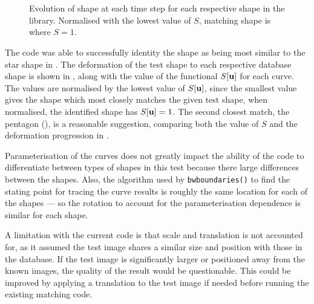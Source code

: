 \documentclass[a4paper, 12pt]{article}
\begin{document}
\begin{figure}[h!]
  \centering
  \\
  \\
  \caption[Results of matching the test shape against the database]{Evolution of shape at each time step for each respective shape in the
    library. Normalised with the lowest value of $S$, matching shape is where $S
  = 1$.}
  \label{fig:shape_match}
\end{figure}

The code was able to successfully identity the shape  as being
most similar to the star shape in . The deformation of the test shape
to each respective database shape is shown in , along with the
value of the functional $S[\mathbf{u}]$ for each curve. The values are normalised by the lowest
value of $S[\mathbf{u}]$, since the smallest value gives the shape which most closely
matches the given test shape,  when normalised, the identified shape has
$S[\mathbf{u}] = 1$. The second closest match, the pentagon (), is
a reasonable suggestion, comparing both the value of $S$ and the deformation
progression in .

Parameterisation of the curves does not greatly impact the ability of the code
to differentiate between types of shapes in this test because there large
differences between the shapes. Also, the algorithm used by
\texttt{bwboundaries()} to find the stating point for tracing the curve results
is roughly the same location for each of the shapes --- so the rotation to
account for the parameterisation dependence is similar for each shape.

A limitation with the current code is that scale and translation is not
accounted for, as it assumed the test image shares a similar size and position
with those in the database. If the test image is significantly larger or
positioned away from the known images, the quality of the result would be
questionable. This could be improved by applying a translation to the test image
if needed before running the existing matching code.
\end{document}
